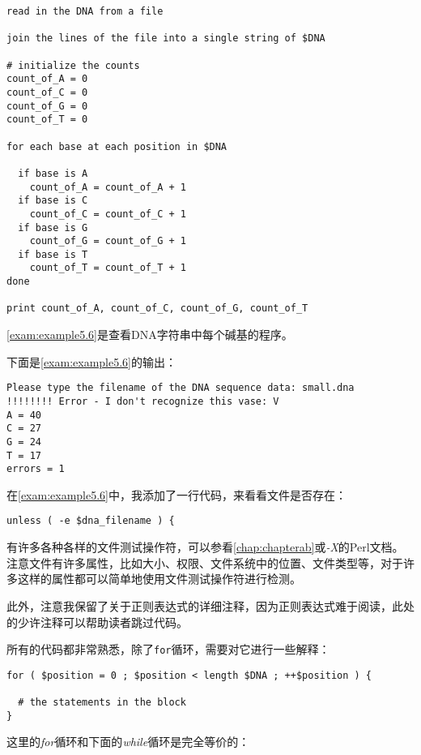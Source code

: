 \begin{lstlisting}
read in the DNA from a file

join the lines of the file into a single string of $DNA

# initialize the counts
count_of_A = 0
count_of_C = 0
count_of_G = 0
count_of_T = 0

for each base at each position in $DNA

  if base is A
    count_of_A = count_of_A + 1
  if base is C
    count_of_C = count_of_C + 1
  if base is G
    count_of_G = count_of_G + 1
  if base is T
    count_of_T = count_of_T + 1
done

print count_of_A, count_of_C, count_of_G, count_of_T
\end{lstlisting}

\autoref{exam:example5.6}是查看DNA字符串中每个碱基的程序。



下面是\autoref{exam:example5.6}的输出：

\begin{lstlisting}
Please type the filename of the DNA sequence data: small.dna
!!!!!!!! Error - I don't recognize this vase: V
A = 40
C = 27
G = 24
T = 17
errors = 1
\end{lstlisting}

在\autoref{exam:example5.6}中，我添加了一行代码，来看看文件是否存在：

\begin{lstlisting}
unless ( -e $dna_filename ) {
\end{lstlisting}

有许多各种各样的文件测试操作符，可以参看\autoref{chap:chapterab}或\textit{-X}的Perl文档。注意文件有许多属性，比如大小、权限、文件系统中的位置、文件类型等，对于许多这样的属性都可以简单地使用文件测试操作符进行检测。

此外，注意我保留了关于正则表达式的详细注释，因为正则表达式难于阅读，此处的少许注释可以帮助读者跳过代码。

所有的代码都非常熟悉，除了\verb|for|循环，需要对它进行一些解释：

\begin{lstlisting}
for ( $position = 0 ; $position < length $DNA ; ++$position ) {
  
  # the statements in the block
}
\end{lstlisting}

这里的\textit{for}循环和下面的\textit{while}循环是完全等价的：

